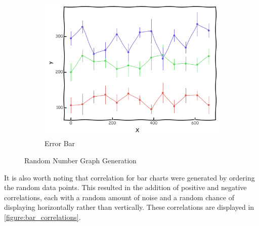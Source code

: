 \begin{figure}
    \hfill
    \begin{subfigure}[b]{0.32\textwidth}
        \centering
        \includegraphics[width=\textwidth]{figures/body/methodology/random_error.png}
        \caption{Error Bar}
        \label{figure:random_error}
    \end{subfigure}
    \caption{Random Number Graph Generation}
    \label{figure:rand_num_data_gen}
\end{figure}

It is also worth noting that correlation for bar charts were generated by ordering the random data points. This resulted in the addition of positive and negative correlations, each with a random amount of noise and a random chance of displaying horizontally rather than vertically. These correlations are displayed in \autoref{figure:bar_correlations}.

\hfill

